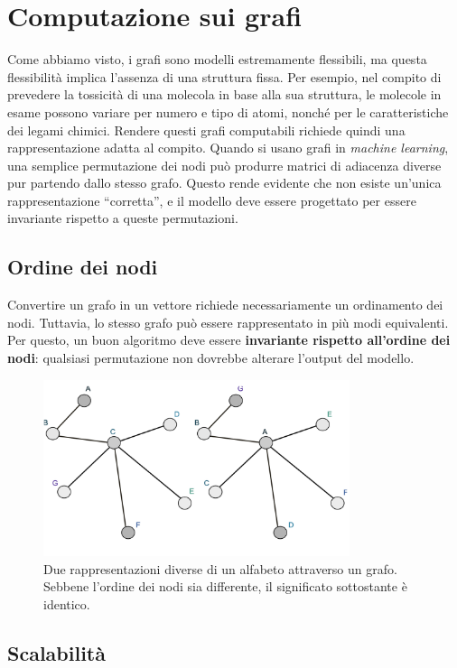 \section{Computazione sui grafi}

Come abbiamo visto, i grafi sono modelli estremamente flessibili, ma questa flessibilità implica l’assenza di una struttura fissa. Per esempio, nel compito di prevedere la tossicità di una molecola in base alla sua struttura, le molecole in esame possono variare per numero e tipo di atomi, nonché per le caratteristiche dei legami chimici. Rendere questi grafi computabili richiede quindi una rappresentazione adatta al compito. Quando si usano grafi in \textit{machine learning}, una semplice permutazione dei nodi può produrre matrici di adiacenza diverse pur partendo dallo stesso grafo. Questo rende evidente che non esiste un’unica rappresentazione “corretta”, e il modello deve essere progettato per essere invariante rispetto a queste permutazioni.

\subsection{Ordine dei nodi}

Convertire un grafo in un vettore richiede necessariamente un ordinamento dei nodi. Tuttavia, lo stesso grafo può essere rappresentato in più modi equivalenti. Per questo, un buon algoritmo deve essere \textbf{invariante rispetto all’ordine dei nodi}: qualsiasi permutazione non dovrebbe alterare l’output del modello.
\begin{figure}
    \centering
    \includegraphics[width=0.8\textwidth]{figure/OrderNode}
    \caption{Due rappresentazioni diverse di un alfabeto attraverso un grafo. Sebbene l’ordine dei nodi sia differente, il significato sottostante è identico.}
    \label{fig:ordNode}
\end{figure}

\subsection{Scalabilità}

